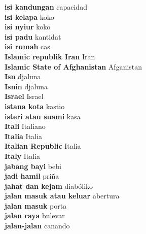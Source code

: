 \textbf{ isi kandungan  } capacidad \\
\textbf{ isi kelapa  } koko \\
\textbf{ isi nyiur  } koko \\
\textbf{ isi padu  } kantidat \\
\textbf{ isi rumah  } cas \\
\textbf{ Islamic republik Iran  } Iran \\
\textbf{ Islamic State of Afghanistan  } Afganistan \\
\textbf{ Isn  } djaluna \\
\textbf{ Isnin  } djaluna \\
\textbf{ Israel  } Israel \\
\textbf{ istana kota  } kastio \\
\textbf{ isteri atau suami  } kasa \\
\textbf{ Itali  } Italiano \\
\textbf{ Italia  } Italia \\
\textbf{ Italian Republic  } Italia \\
\textbf{ Italy  } Italia \\
\textbf{ jabang bayi  } bebi \\
\textbf{ jadi hamil  } priña \\
\textbf{ jahat dan kejam  } diabóliko \\
\textbf{ jalan masuk atau keluar  } abertura \\
\textbf{ jalan masuk  } porta \\
\textbf{ jalan raya  } bulevar \\
\textbf{ jalan-jalan  } canando \\
